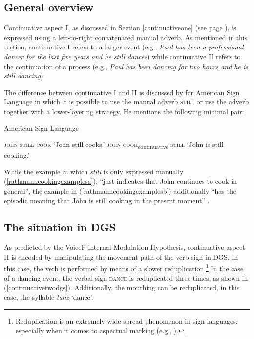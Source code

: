\subsection{General overview}
Continuative aspect I, as discussed in Section \ref{continuativeone} (see page \pageref{continuativeone}), is expressed using a left-to-right concatenated manual adverb. As mentioned in this section, continuative I refers to a larger event (e.g., \textit{Paul has been a professional dancer for the last five years and he still dances}) while continuative II refers to the continuation of a process (e.g., \textit{Paul has been dancing for two hours and he is still dancing}).

The difference between continuative I and II is discussed by \citet[35]{rathmann2005event} for American Sign Language in which it is possible to use the manual adverb \textsc{still} or use the adverb together with a lower-layering strategy. He mentions the following minimal pair:

\begin{exe}
\ex American Sign Language \citep[35]{rathmann2005event}\label{rathmanncookingexamples}\begin{xlist}
\ex \textsc{john still cook}
\glt `John still cooks.' \label{rathmanncookingexamplesa}
\ex \textsc{john cook}\textsubscript{continuative} \textsc{still}
\glt `John is still cooking.' \label{rathmanncookingexamplesb}

\end{xlist}
\end{exe}

\noindent While the example in which \textit{still} is only expressed manually (\ref{rathmanncookingexamplesa}), ``just indicates that John continues to cook in general'', the example in (\ref{rathmanncookingexamplesb}) additionally ``has the episodic meaning that John is still cooking in the present moment'' \citep[35]{rathmann2005event}. 

\subsection{The situation in DGS}
As predicted by the VoiceP-internal Modulation Hypothesis, continuative aspect II is encoded by manipulating the movement path of the verb sign in DGS. In this case, the verb is performed by means of a slower reduplication.\footnote{ Reduplication is an extremely wide-spread phenomenon in sign languages, especially when it comes to aspectual marking (e.g., \citealt{klima1979signs, wilbur2005reanalysis, wilbur2009productive}).} In the case of a dancing event, the verbal sign \textsc{dance} is reduplicated three times, as shown in (\ref{continuativetwodgs}). Additionally, the mouthing can be reduplicated, in this case, the syllable \textit{tanz} `dance'. 

